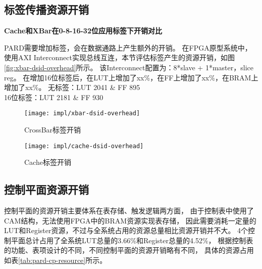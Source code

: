 \subsection{标签传播资源开销}

\textbf{Cache和XBar在0-8-16-32位应用标签下开销对比}

PARD需要增加标签，会在数据通路上产生额外的开销。
在FPGA原型系统中，使用AXI Interconnect实现总线互连，本节评估标签产生的资源开销，如图\ref{fig:xbar-dsid-overhead}所示。
该Interconnect配置为：8*slave + 1*master，slice reg。
在增加16位标签后，在LUT上增加了xx\%，在FF上增加了xx\%，在BRAM上增加了xx\%。
无标签：LUT 2041 \& FF 895\\
16位标签：LUT 2181 \& FF 930

\begin{figure}[tb]
\begin{minipage}{0.48\textwidth}
  \centering
  \texttt{[image: impl/xbar-dsid-overhead]}
  \caption{CrossBar标签开销}
  \label{fig:xbar-dsid-overhead}
\end{minipage}\hfill
\begin{minipage}{0.48\textwidth}
  \centering
  \texttt{[image: impl/cache-dsid-overhead]}
  \caption{Cache标签开销}
  \label{fig:cache-dsid-overhead}
\end{minipage}
\end{figure}


\subsection{控制平面资源开销}

控制平面的资源开销主要体系在表存储、触发逻辑两方面，
由于控制表中使用了CAM结构，无法使用FPGA中的BRAM资源实现表存储，
因此需要消耗一定量的LUT和Register资源，不过与全系统占用的资源总量相比资源开销并不大。
4个控制平面总计占用了全系统LUT总量的3.66\%和Register总量的4.52\%，
根据控制表的功能、表项设计的不同，不同控制平面的资源开销略有不同，
具体的资源占用如表\ref{tab:pard-cp-resource}所示。

